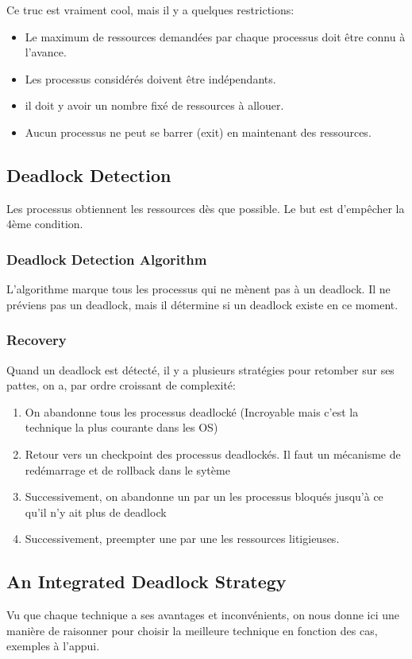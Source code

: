 Ce truc est vraiment cool, mais il y a quelques restrictions:
\begin{itemize}
  \item Le maximum de ressources demandées par chaque processus doit être connu à l'avance.
  \item Les processus considérés doivent être indépendants.
  \item il doit y avoir un nombre fixé de ressources à allouer.
  \item Aucun processus ne peut se barrer (exit) en maintenant des ressources.
\end{itemize}

\subsection{Deadlock Detection}
Les processus obtiennent les ressources dès que possible.
Le but est d'empêcher la 4ème condition.

\subsubsection{Deadlock Detection Algorithm}
L'algorithme marque tous les processus qui ne mènent pas à un deadlock.
Il ne préviens pas un deadlock, mais il détermine si un deadlock existe en ce moment.

\subsubsection{Recovery}
Quand un deadlock est détecté, il y a plusieurs stratégies pour retomber sur ses pattes,
on a, par ordre croissant de complexité:
\begin{enumerate}
  \item On abandonne tous les processus deadlocké (Incroyable mais c'est la technique la plus courante dans les OS)
  \item Retour vers un checkpoint des processus deadlockés.
    Il faut un mécanisme de redémarrage et de rollback dans le sytème
  \item Successivement, on abandonne un par un les processus bloqués jusqu'à ce qu'il n'y ait plus de deadlock
  \item Successivement, preempter une par une les ressources litigieuses.
\end{enumerate}

\subsection{An Integrated Deadlock Strategy}
Vu que chaque technique a ses avantages et inconvénients,
on nous donne ici une manière de raisonner pour choisir la meilleure technique en fonction des cas, exemples à l'appui.

